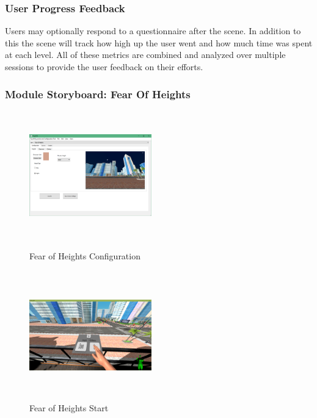 \documentclass[a4paper,10pt]{article}
\begin{document}
\subsubsection{User Progress Feedback}
Users may optionally respond to a questionnaire after the scene. In addition to this the scene will track how high up the user went and how much time was spent at each level. All of these metrics are combined and analyzed over multiple sessions to provide the user feedback on their efforts.

\pagebreak
\subsubsection{Module Storyboard: Fear Of Heights}
\begin{figure}[H]
	\centering
	\begin{minipage}{0.45\textwidth}
		\centering
		\includegraphics[width=200px, height=210px, keepaspectratio]{qtHeightSettings.png}
		\caption{Fear of Heights Configuration}
		\label{fig:qtHeightSettings}
	\end{minipage}\hfill
	\begin{minipage}{0.45\textwidth}
		\centering
		\includegraphics[width=200px, height=210px, keepaspectratio]{heightSS1.png}
		\caption{Fear of Heights Start}
		\label{fig:heightSS1}
	\end{minipage}
\end{figure}
\end{document}

